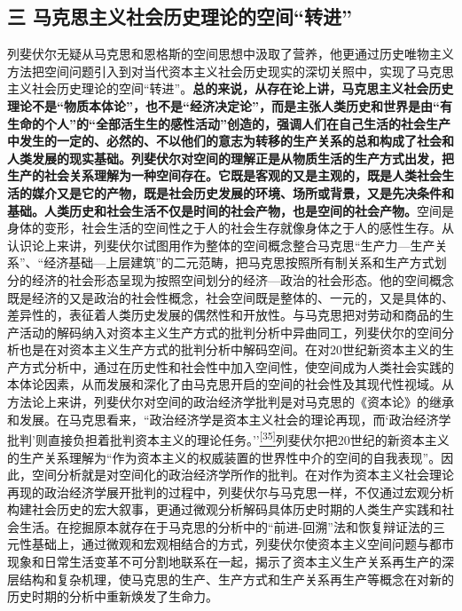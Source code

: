\documentclass[UTF8, fontset = sourcesans, a4paper, oneside, zihao =
-4, scheme=chinese, no-math, space=true]{ctexbook}
\begin{document}
\subsection{\texorpdfstring{三
马克思主义社会历史理论的空间``转进''}{三 马克思主义社会历史理论的空间转进}}\label{part0010_split_002.htmlux5cux23c060}

列斐伏尔无疑从马克思和恩格斯的空间思想中汲取了营养，他更通过历史唯物主义方法把空间问题引入到对当代资本主义社会历史现实的深切关照中，实现了马克思主义社会历史理论的空间``转进''。\textbf{总的来说，从存在论上讲，马克思主义社会历史理论不是``物质本体论''，也不是``经济决定论''，而是主张人类历史和世界是由``有生命的个人''的``全部活生生的感性活动''创造的，强调人们在自己生活的社会生产中发生的一定的、必然的、不以他们的意志为转移的生产关系的总和构成了社会和人类发展的现实基础。列斐伏尔对空间的理解正是从物质生活的生产方式出发，把生产的社会关系理解为一种空间存在。它既是客观的又是主观的，既是人类社会生活的媒介又是它的产物，既是社会历史发展的环境、场所或背景，又是先决条件和基础。人类历史和社会生活不仅是时间的社会产物，也是空间的社会产物。}空间是身体的变形，社会生活的空间性之于人的社会生存就像身体之于人的感性生存。从认识论上来讲，列斐伏尔试图用作为整体的空间概念整合马克思``生产力---生产关系''、``经济基础---上层建筑''的二元范畴，把马克思按照所有制关系和生产方式划分的经济的社会形态呈现为按照空间划分的经济---政治的社会形态。他的空间概念既是经济的又是政治的社会性概念，社会空间既是整体的、一元的，又是具体的、差异性的，表征着人类历史发展的偶然性和开放性。与马克思把对劳动和商品的生产活动的解码纳入对资本主义生产方式的批判分析中异曲同工，列斐伏尔的空间分析也是在对资本主义生产方式的批判分析中解码空间。在对20世纪新资本主义的生产方式分析中，通过在历史性和社会性中加入空间性，使空间成为人类社会实践的本体论因素，从而发展和深化了由马克思开启的空间的社会性及其现代性视域。从方法论上来讲，列斐伏尔对空间的政治经济学批判是对马克思的《资本论》的继承和发展。在马克思看来，``政治经济学是资本主义社会的理论再现，而`政治经济学批判'则直接负担着批判资本主义的理论任务。''\protect\hypertarget{part0010_split_002.htmlux5cux23w35}{}{}\protect\hyperlink{part0010_split_002.htmlux5cux23m35}{\textsuperscript{{[}35{]}}}列斐伏尔把20世纪的新资本主义的生产关系理解为``作为资本主义的权威装置的世界性中介的空间的自我表现''。因此，空间分析就是对空间化的政治经济学所作的批判。在对作为资本主义社会理论再现的政治经济学展开批判的过程中，列斐伏尔与马克思一样，不仅通过宏观分析构建社会历史的宏大叙事，更通过微观分析解码具体历史时期的人类生产实践和社会生活。在挖掘原本就存在于马克思的分析中的``前进-回溯''法和恢复辩证法的三元性基础上，通过微观和宏观相结合的方式，列斐伏尔使资本主义空间问题与都市现象和日常生活变革不可分割地联系在一起，揭示了资本主义生产关系再生产的深层结构和复杂机理，使马克思的生产、生产方式和生产关系再生产等概念在对新的历史时期的分析中重新焕发了生命力。
\end{document}
